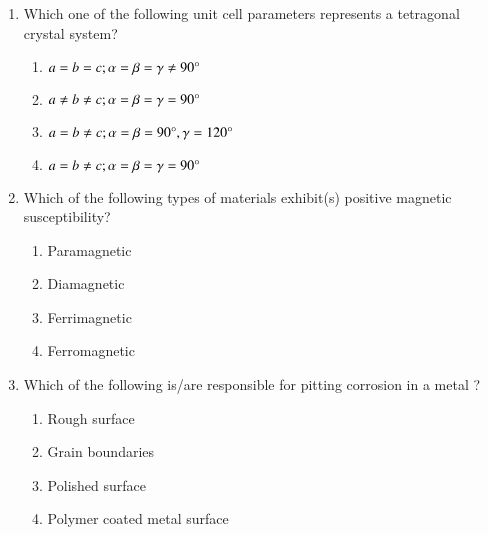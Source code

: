\documentclass[journal]{IEEEtran}
\begin{document}
\begin{enumerate}[start=40]
\item Which one of the following unit cell parameters represents a tetragonal crystal
system? 
\begin{multicols}{2}
\begin{enumerate}
\item $a = b = c ; \alpha=  \beta=  \gamma\neq  90\degree $
\item $a \neq b \neq c ; \alpha=  \beta=  \gamma=  90\degree $
\item $a = b \neq c ; \alpha=  \beta=90\degree,  \gamma=  120\degree $
\item $a = b \neq c ; \alpha=  \beta=  \gamma=  90\degree $
\end{enumerate}
\end{multicols}

\item Which of the following types of materials exhibit(s) positive magnetic
susceptibility? 
\begin{multicols}{4}
\begin{enumerate}
\item Paramagnetic 
\item Diamagnetic 
\item Ferrimagnetic
\item Ferromagnetic
\end{enumerate}
\end{multicols}

\item Which of the following is/are responsible for pitting corrosion in a metal ?
\begin{multicols}{2}
\begin{enumerate}
\item Rough surface
\item Grain boundaries 
\item Polished surface 
\item Polymer coated metal surface
\end{enumerate}
\end{multicols}


\end{enumerate}
\end{document}
